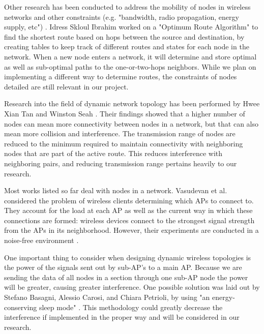 \documentclass{sigcomm-alternate}
\begin{document}
Other research has been conducted to address the mobility of nodes in wireless networks and other constraints (e.g. "bandwidth, radio propagation, energy supply, etc") \cite{phdthesis1}. Idress Skloul Ibrahim  worked on a "Optimum Route Algorithm" to find the shortest route based on hops between the source and destination, by creating tables to keep track of different routes and states for each node in the network. When a new node enters a network, it will determine and store optimal as well as sub-optimal paths to the one-or-two-hops neighbors. While we plan on implementing a different way to determine routes, the constraints of nodes detailed are still relevant in our project.


Research into the field of dynamic network topology has been performed by Hwee Xian Tan and Winston Seah \cite{dynamictopology}. Their findings showed that a higher number of nodes can mean more connectivity between nodes in a network, but that can also mean more collision and interference. The transmission range of nodes are reduced to the minimum required to maintain connectivity with neighboring nodes that are part of the active route. This reduces interference with neighboring pairs, and reducing transmission range pertains heavily to our research.


Most works listed so far deal with nodes in a network. Vasudevan et al. considered the problem of wireless clients determining which APs to connect to. They account for the load at each AP as well as the current way in which these connections are formed: wireless devices connect to the strongest signal strength from the APs in its neighborhood. However, their experiments are conducted in a noise-free environment \cite{apselection}. 


One important thing to consider when designing dynamic wireless topologies is the power of the signals sent out by sub-AP's to a main AP. Because we are sending the data of all nodes in a section through one sub-AP node the power will be greater, causing greater interference. One possible solution was laid out by Stefano Basagni, Alessio Carosi, and Chiara Petrioli, by using "an energy-conserving sleep mode" \cite{DMAC}.  This methodology could greatly decrease the interference if implemented in the proper way and will be considered in our research. 
\end{document}
